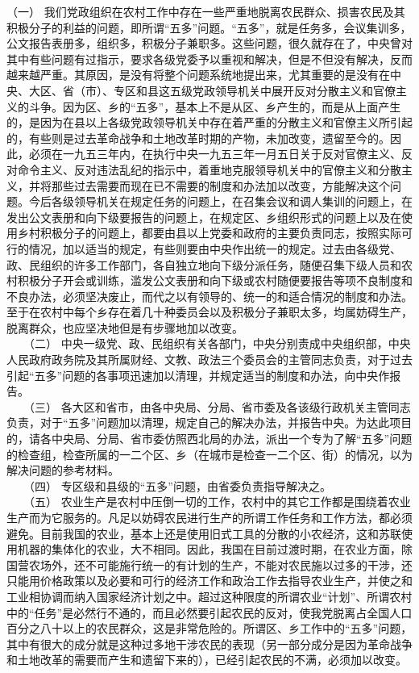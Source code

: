 \documentclass[cn,11pt,chinese]{elegantbook}
\begin{document}
（一） 我们党政组织在农村工作中存在一些严重地脱离农民群众、损害农民及其积极分子的利益的问题，即所谓“五多”问题。“五多”，就是任务多，会议集训多，公文报告表册多，组织多，积极分子兼职多。这些问题，很久就存在了，中央曾对其中有些问题有过指示，要求各级党委予以重视和解决，但是不但没有解决，反而越来越严重。其原因，是没有将整个问题系统地提出来，尤其重要的是没有在中央、大区、省（市）、专区和县这五级党政领导机关中展开反对分散主义和官僚主义的斗争。因为区、乡的“五多”，基本上不是从区、乡产生的，而是从上面产生的，是因为在县以上各级党政领导机关中存在着严重的分散主义和官僚主义所引起的，有些则是过去革命战争和土地改革时期的产物，未加改变，遗留至今的。因此，必须在一九五三年内，在执行中央一九五三年一月五日关于反对官僚主义、反对命令主义、反对违法乱纪的指示中，着重地克服领导机关中的官僚主义和分散主义，并将那些过去需要而现在已不需要的制度和办法加以改变，方能解决这个问题。今后各级领导机关在规定任务的问题上，在召集会议和调人集训的问题上，在发出公文表册和向下级要报告的问题上，在规定区、乡组织形式的问题上以及在使用乡村积极分子的问题上，都要由县以上党委和政府的主要负责同志，按照实际可行的情况，加以适当的规定，有些则要由中央作出统一的规定。过去由各级党、政、民组织的许多工作部门，各自独立地向下级分派任务，随便召集下级人员和农村积极分子开会或训练，滥发公文表册和向下级或农村随便要报告等项不良制度和不良办法，必须坚决废止，而代之以有领导的、统一的和适合情况的制度和办法。至于在农村中每个乡存在着几十种委员会以及积极分子兼职太多，均属妨碍生产，脱离群众，也应坚决地但是有步骤地加以改变。\\
　　（二） 中央一级党、政、民组织有关各部门，中央分别责成中央组织部，中央人民政府政务院及其所属财经、文教、政法三个委员会的主管同志负责，对于过去引起“五多”问题的各事项迅速加以清理，并规定适当的制度和办法，向中央作报告。\\
　　（三） 各大区和省市，由各中央局、分局、省市委及各该级行政机关主管同志负责，对于“五多”问题加以清理，规定自己的解决办法，并报告中央。为达此项目的，请各中央局、分局、省市委仿照西北局的办法，派出一个专为了解“五多”问题的检查组，检查所属的一二个区、乡（在城市是检查一二个区、街）的情况，以为解决问题的参考材料。\\
　　（四） 专区级和县级的“五多”问题，由省委负责指导解决之。\\
　　（五） 农业生产是农村中压倒一切的工作，农村中的其它工作都是围绕着农业生产而为它服务的。凡足以妨碍农民进行生产的所谓工作任务和工作方法，都必须避免。目前我国的农业，基本上还是使用旧式工具的分散的小农经济，这和苏联使用机器的集体化的农业，大不相同。因此，我国在目前过渡时期，在农业方面，除国营农场外，还不可能施行统一的有计划的生产，不能对农民施以过多的干涉，还只能用价格政策以及必要和可行的经济工作和政治工作去指导农业生产，并使之和工业相协调而纳入国家经济计划之中。超过这种限度的所谓农业“计划”、所谓农村中的“任务”是必然行不通的，而且必然要引起农民的反对，使我党脱离占全国人口百分之八十以上的农民群众，这是非常危险的。所谓区、乡工作中的“五多”问题，其中有很大的成分就是这种过多地干涉农民的表现（另一部分成分是因为革命战争和土地改革的需要而产生和遗留下来的），已经引起农民的不满，必须加以改变。\\
\end{document}
